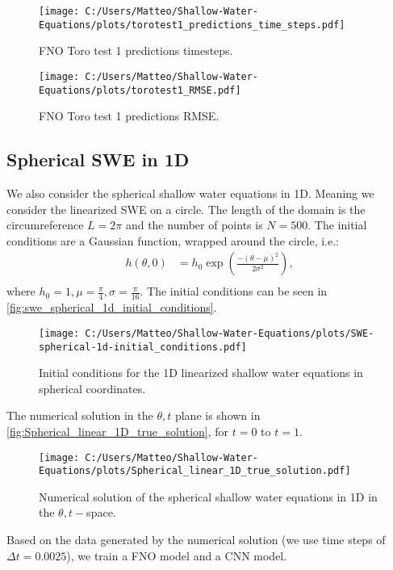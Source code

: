 \begin{figure}[H]
    \centering
    \texttt{[image: C:/Users/Matteo/Shallow-Water-Equations/plots/torotest1\_predictions\_time\_steps.pdf]}
    \caption{FNO Toro test 1 predictions timesteps.}\label{fig:FNO_Toro_test1_predictions_time_steps}
\end{figure}


\begin{figure}[H]
    \centering
    \texttt{[image: C:/Users/Matteo/Shallow-Water-Equations/plots/torotest1\_RMSE.pdf]}
    \caption{FNO Toro test 1 predictions RMSE.}\label{fig:FNO_Toro_test1_rmse}
\end{figure}

\subsection{Spherical SWE in 1D}
We also consider the spherical shallow water equations in 1D.
Meaning we consider the linearized SWE on a circle.
The length of the domain is the circumreference $L = 2\pi$ and the number of points is $N = 500$.
The initial conditions are a Gaussian function, wrapped around the circle, i.e.:
\begin{align*}
    h(\theta, 0) &= h_0 \exp \left( \frac{-{(\theta-\mu)}^2}{2 \sigma^2} \right) ,\\
\end{align*}
where $h_0 = 1, \mu = \frac{\pi}{4}, \sigma = \frac{\pi}{16}$.
The initial conditions can be seen in \autoref{fig:swe_spherical_1d_initial_conditions}.
\begin{figure}[H]
    \centering
    \texttt{[image: C:/Users/Matteo/Shallow-Water-Equations/plots/SWE-spherical-1d-initial\_conditions.pdf]}
    \caption{Initial conditions for the 1D linearized shallow water equations in spherical coordinates.}\label{fig:swe_spherical_1d_initial_conditions}
\end{figure}
The numerical solution in the $\theta,t$ plane is shown in \autoref{fig:Spherical_linear_1D_true_solution}, for $t=0$ to $t=1$.
\begin{figure}[H]
    \centering
    \texttt{[image: C:/Users/Matteo/Shallow-Water-Equations/plots/Spherical\_linear\_1D\_true\_solution.pdf]}
    \caption{Numerical solution of the spherical shallow water equations in 1D in the $\theta,t-$space.}\label{fig:Spherical_linear_1D_true_solution}
\end{figure}
Based on the data generated by the numerical solution (we use time steps of $\Delta t = 0.0025$), we train a FNO model and a CNN model.

